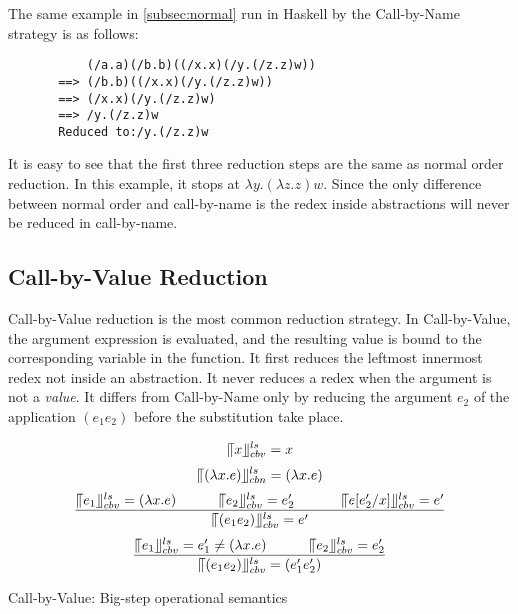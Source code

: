The same example in \ref{subsec:normal} run in Haskell by the Call-by-Name strategy is as follows:

\begin{verbatim}
           (/a.a)(/b.b)((/x.x)(/y.(/z.z)w))
       ==> (/b.b)((/x.x)(/y.(/z.z)w))
       ==> (/x.x)(/y.(/z.z)w)
       ==> /y.(/z.z)w
       Reduced to:/y.(/z.z)w
\end{verbatim}

It is easy to see that the first three reduction steps are the same as normal order reduction. In this example, it stops at $\lambda y.(\lambda z.z)w$. Since the only difference between normal order and call-by-name is the redex inside abstractions will never be reduced in call-by-name. 


\subsection{Call-by-Value Reduction}{\label{subsec:cbv}}

Call-by-Value reduction is the most common reduction strategy. In Call-by-Value, the argument expression is evaluated, and the resulting value is bound to the corresponding variable in the function. It first reduces the leftmost innermost redex not inside an abstraction. It never reduces a redex when the argument is not a \textit{value}. It differs from Call-by-Name only by reducing the argument $e_2$ of the application $(e_1e_2)$ before the substitution take place. 


\begin{equation*}
\llceil x \rrfloor ^{ls} _{cbv} = x
\end{equation*}
\begin{equation*}
\llceil (\lambda x.e) \rrfloor ^{ls} _{cbn} = (\lambda x.e)
\end{equation*}
\begin{equation*}
\frac{\llceil e_1 \rrfloor ^{ls} _{cbv} = (\lambda x.e)\ \ \ \ \ \ \ \ \ \llceil e_2 \rrfloor ^{ls} _{cbv} = e'_2\ \ \ \ \ \ \ \ \ \ \llceil e[e'_2/x] \rrfloor ^{ls} _{cbv}  = e'}{\llceil (e_1e_2) \rrfloor ^{ls} _{cbv} = e'}
\end{equation*}
\begin{equation*}
\frac{\llceil e_1 \rrfloor ^{ls} _{cbv} = e'_1\neq (\lambda x.e)\ \ \ \ \ \ \ \ \ \llceil e_2 \rrfloor ^{ls} _{cbv} = e'_2}{\llceil (e_1e_2) \rrfloor ^{ls} _{cbv} = (e'_1e'_2)}
\end{equation*}
\begin{center}
Call-by-Value: Big-step operational semantics
\end{center}

